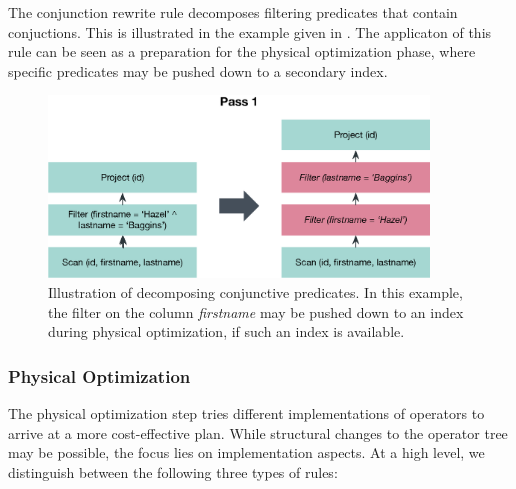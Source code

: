 The conjunction rewrite rule decomposes filtering predicates that contain conjuctions. This is illustrated in the example given in . The applicaton of this rule can be seen as a preparation for the physical optimization phase, where specific predicates may be pushed down to a secondary index.

\begin{figure}[bt]
    \centering
    \includegraphics[width=0.9\textwidth]{figures/logical-rule-conjunction}
    \caption{Illustration of decomposing conjunctive predicates. In this example, the filter on the column \emph{firstname} may be pushed down to an index during physical optimization, if such an index is available.}
    \label{figure:cottontail_logical_rule_conjunction}
\end{figure}

\subsubsection{Physical Optimization}

The physical optimization step tries different implementations of operators to arrive at a more cost-effective plan. While structural changes to the operator tree may be possible, the focus lies on implementation aspects.  At a high level, we distinguish between the following three types of rules:

